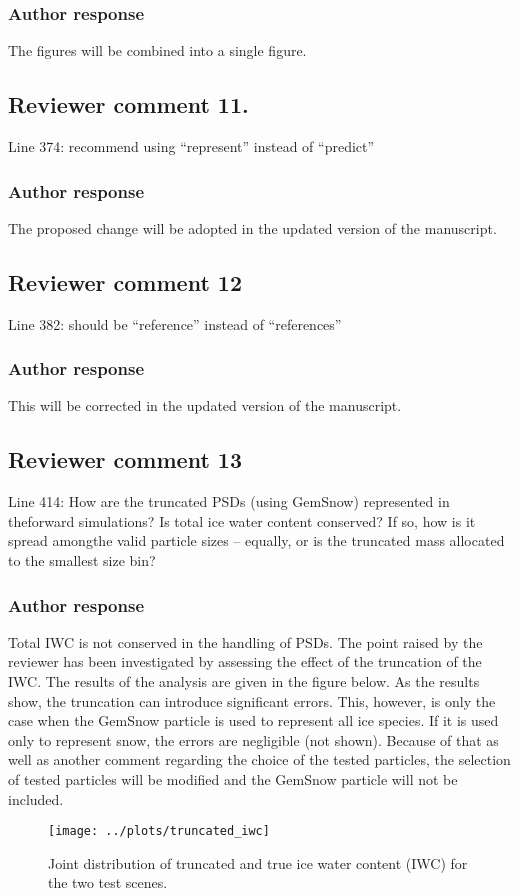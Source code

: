\documentclass[11pt]{scrartcl}
\begin{document}
\subsubsection*{Author response}
The figures will be combined into a single figure.

\subsection*{Reviewer comment 11.}
 Line 374: recommend using “represent” instead of “predict”

\subsubsection*{Author response}
The proposed change will be adopted in the updated version of the manuscript.

\subsection*{Reviewer comment 12}
 Line 382: should be “reference” instead of “references”

\subsubsection*{Author response}
This will be corrected in the updated version of the manuscript.

\subsection*{Reviewer comment 13}

Line  414:  How  are  the  truncated  PSDs  (using  GemSnow)  represented  in  theforward simulations? Is total ice water content conserved? If so, how is it spread amongthe valid particle sizes – equally, or is the truncated mass allocated to the smallest size bin?

\subsubsection*{Author response}
Total IWC is not conserved in the handling of PSDs. The point raised by the reviewer has been
investigated by assessing the effect of the truncation of the IWC. The results of the analysis
are given in the figure below. As the results show, the truncation can introduce significant
errors. This, however, is only the case when the GemSnow particle is used to represent all
ice species. If it is used only to represent snow, the errors are negligible (not shown). Because
of that as well as another comment regarding the choice of the tested particles, the selection of
tested particles will be modified and the GemSnow particle will not be included.

\begin{figure}[!hbpt]
  \centering
  \texttt{[image: ../plots/truncated\_iwc]}
  \caption{Joint distribution of truncated and true ice water content (IWC) for the
    two test scenes.}
\end{figure}
\end{document}

